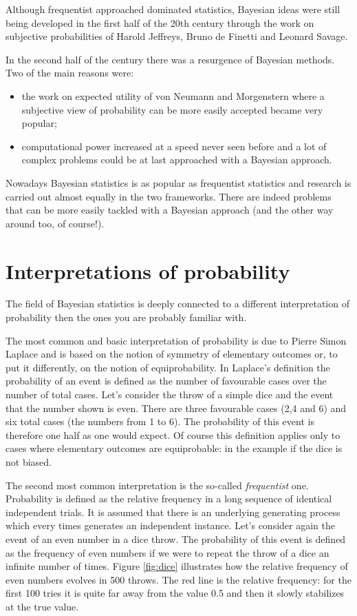 \documentclass[
]{book}
\begin{document}
Although frequentist approached dominated statistics, Bayesian ideas were still being developed in the first half of the 20th century through the work on subjective probabilities of Harold Jeffreys, Bruno de Finetti and Leonard Savage.

In the second half of the century there was a resurgence of Bayesian methods. Two of the main reasons were:

\begin{itemize}
\item
  the work on expected utility of von Neumann and Morgenstern where a subjective view of probability can be more easily accepted became very popular;
\item
  computational power increased at a speed never seen before and a lot of complex problems could be at last approached with a Bayesian approach.
\end{itemize}

Nowadays Bayesian statistics is as popular as frequentist statistics and research is carried out almost equally in the two frameworks. There are indeed problems that can be more easily tackled with a Bayesian approach (and the other way around too, of course!).

\hypertarget{interpretations-of-probability}{%
\section{Interpretations of probability}\label{interpretations-of-probability}}

The field of Bayesian statistics is deeply connected to a different interpretation of probability then the ones you are probably familiar with.

The most common and basic interpretation of probability is due to Pierre Simon Laplace and is based on the notion of symmetry of elementary outcomes or, to put it differently, on the notion of equiprobability. In Laplace's definition the probability of an event is defined as the number of favourable cases over the number of total cases. Let's consider the throw of a simple dice and the event that the number shown is even. There are three favourable cases (2,4 and 6) and six total cases (the numbers from 1 to 6). The probability of this event is therefore one half as one would expect. Of course this definition applies only to cases where elementary outcomes are equiprobable: in the example if the dice is not biased.

The second most common interpretation is the so-called \emph{frequentist} one. Probability is defined as the relative frequency in a long sequence of identical independent trials. It is assumed that there is an underlying generating process which every times generates an independent instance. Let's consider again the event of an even number in a dice throw. The probability of this event is defined as the frequency of even numbers if we were to repeat the throw of a dice an infinite number of times. Figure \ref{fig:dice} illustrates how the relative frequency of even numbers evolves in 500 throws. The red line is the relative frequency: for the first 100 tries it is quite far away from the value 0.5 and then it slowly stabilizes at the true value.
\end{document}
